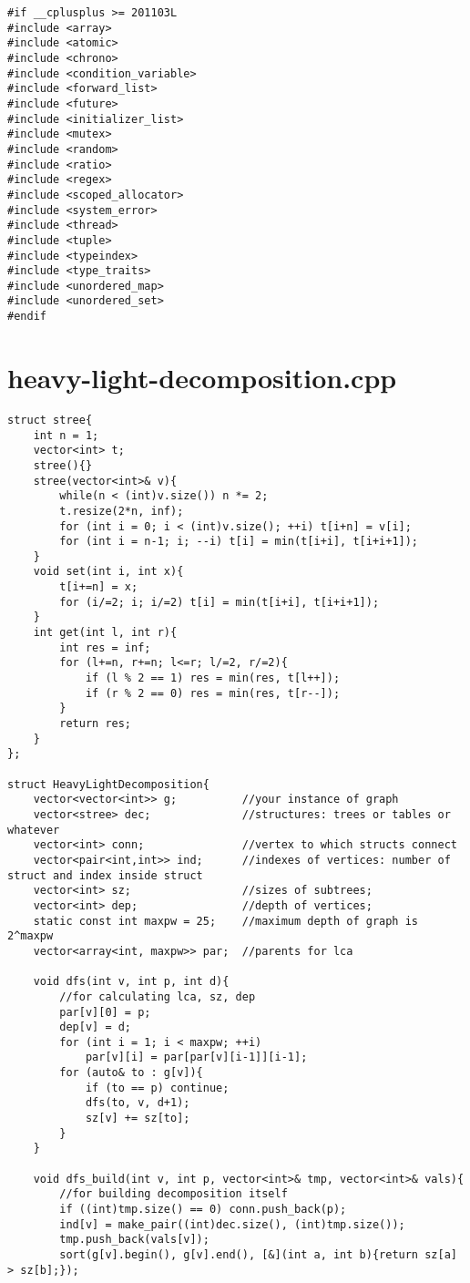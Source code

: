 \documentclass[a4paper,12pt]{report}
\begin{document}
\begin{lstlisting}
#if __cplusplus >= 201103L
#include <array>
#include <atomic>
#include <chrono>
#include <condition_variable>
#include <forward_list>
#include <future>
#include <initializer_list>
#include <mutex>
#include <random>
#include <ratio>
#include <regex>
#include <scoped_allocator>
#include <system_error>
#include <thread>
#include <tuple>
#include <typeindex>
#include <type_traits>
#include <unordered_map>
#include <unordered_set>
#endif

\end{lstlisting}


\section{heavy-light-decomposition.cpp}
\begin{lstlisting}
struct stree{
    int n = 1;
    vector<int> t;
    stree(){}
    stree(vector<int>& v){
        while(n < (int)v.size()) n *= 2;
        t.resize(2*n, inf);
        for (int i = 0; i < (int)v.size(); ++i) t[i+n] = v[i];
        for (int i = n-1; i; --i) t[i] = min(t[i+i], t[i+i+1]);
    }
    void set(int i, int x){
        t[i+=n] = x;
        for (i/=2; i; i/=2) t[i] = min(t[i+i], t[i+i+1]);
    }
    int get(int l, int r){
        int res = inf;
        for (l+=n, r+=n; l<=r; l/=2, r/=2){
            if (l % 2 == 1) res = min(res, t[l++]);
            if (r % 2 == 0) res = min(res, t[r--]);
        }
        return res;
    }
};
 
struct HeavyLightDecomposition{
    vector<vector<int>> g;          //your instance of graph
    vector<stree> dec;              //structures: trees or tables or whatever
    vector<int> conn;               //vertex to which structs connect
    vector<pair<int,int>> ind;      //indexes of vertices: number of struct and index inside struct
    vector<int> sz;                 //sizes of subtrees;
    vector<int> dep;                //depth of vertices;
    static const int maxpw = 25;    //maximum depth of graph is 2^maxpw
    vector<array<int, maxpw>> par;  //parents for lca
 
    void dfs(int v, int p, int d){
        //for calculating lca, sz, dep
        par[v][0] = p;
        dep[v] = d;
        for (int i = 1; i < maxpw; ++i)
            par[v][i] = par[par[v][i-1]][i-1]; 
        for (auto& to : g[v]){
            if (to == p) continue;
            dfs(to, v, d+1);
            sz[v] += sz[to];
        }
    }
 
    void dfs_build(int v, int p, vector<int>& tmp, vector<int>& vals){
        //for building decomposition itself
        if ((int)tmp.size() == 0) conn.push_back(p);
        ind[v] = make_pair((int)dec.size(), (int)tmp.size());
        tmp.push_back(vals[v]);
        sort(g[v].begin(), g[v].end(), [&](int a, int b){return sz[a] > sz[b];});
 

\end{lstlisting}
\end{document}
